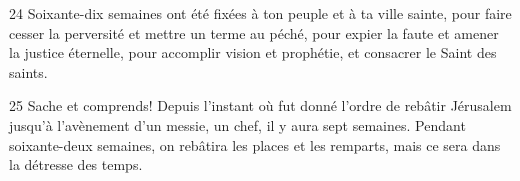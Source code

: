 
24 Soixante-dix semaines ont été fixées à ton peuple et à ta ville sainte, pour faire cesser la perversité et mettre un terme au péché, pour expier la faute et amener la justice éternelle, pour accomplir vision et prophétie, et consacrer le Saint des saints.

25 Sache et comprends! Depuis l’instant où fut donné l’ordre de rebâtir Jérusalem jusqu’à l’avènement d’un messie, un chef, il y aura sept semaines. Pendant soixante-deux semaines, on rebâtira les places et les remparts, mais ce sera dans la détresse des temps.
